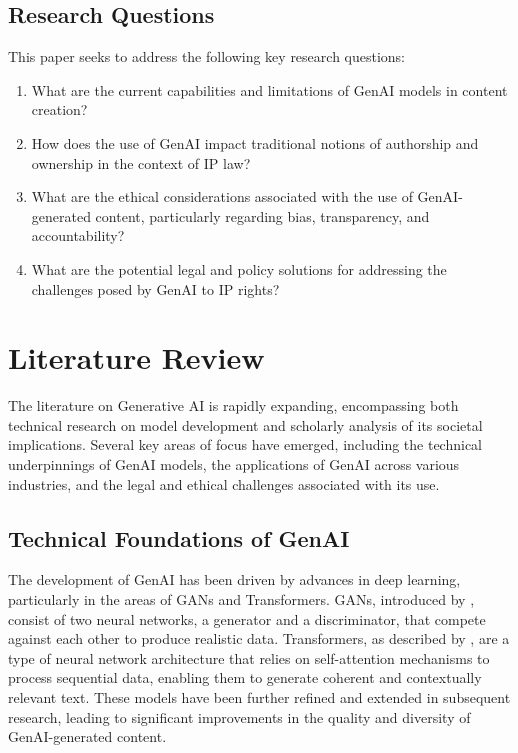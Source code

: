 \documentclass[12pt,a4paper]{article}
\begin{document}
\subsection{Research Questions}
This paper seeks to address the following key research questions:
\begin{enumerate}
    \item What are the current capabilities and limitations of GenAI models in content creation?
    \item How does the use of GenAI impact traditional notions of authorship and ownership in the context of IP law?
    \item What are the ethical considerations associated with the use of GenAI-generated content, particularly regarding bias, transparency, and accountability?
    \item What are the potential legal and policy solutions for addressing the challenges posed by GenAI to IP rights?
\end{enumerate}

\section{Literature Review}
The literature on Generative AI is rapidly expanding, encompassing both technical research on model development and scholarly analysis of its societal implications. Several key areas of focus have emerged, including the technical underpinnings of GenAI models, the applications of GenAI across various industries, and the legal and ethical challenges associated with its use.

\subsection{Technical Foundations of GenAI}
The development of GenAI has been driven by advances in deep learning, particularly in the areas of GANs and Transformers. GANs, introduced by \citet{goodfellow2014generative}, consist of two neural networks, a generator and a discriminator, that compete against each other to produce realistic data. Transformers, as described by \citet{vaswani2017attention}, are a type of neural network architecture that relies on self-attention mechanisms to process sequential data, enabling them to generate coherent and contextually relevant text. These models have been further refined and extended in subsequent research, leading to significant improvements in the quality and diversity of GenAI-generated content.
\end{document}
